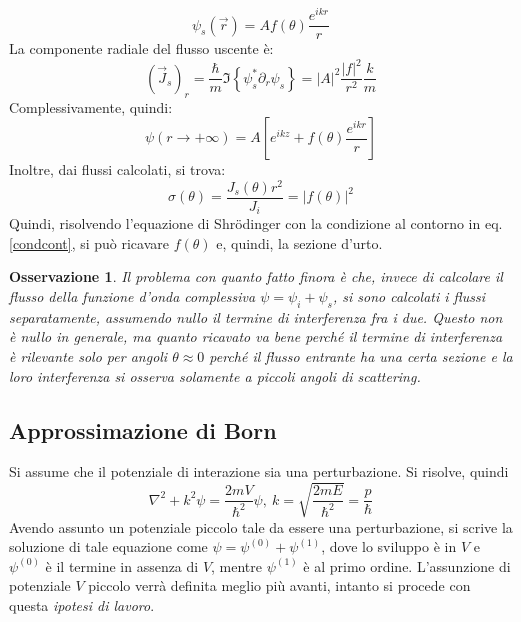 \documentclass[11pt, a4paper]{scrartcl} %
\numberwithin{equation}{subsection}
\theoremstyle{style2}
\newtheorem{osservazione}{Osservazione}[section]
\theoremstyle{style1}
\begin{document}
\begin{equation}
	\psi _s(\vec{r}) =A f(\theta ) \frac{e^{ikr}}{r} 
\end{equation}
La componente radiale del flusso uscente \`e:
\begin{equation}
	(\vec{J}_s)_r = \frac{\hbar }{m}\Im \left\{ \psi ^*_s \partial _r \psi _s \right\} = \lvert A \rvert ^2 \frac{\lvert f \rvert ^2}{r^2} \frac{k}{m}
\end{equation}
Complessivamente, quindi:
\begin{equation}\label{condcont}
	\psi (r\to +\infty) = A \left[ e^{ikz} + f(\theta ) \frac{e^{ikr} }{r} \right] 
\end{equation}
Inoltre, dai flussi calcolati, si trova:
\begin{equation}
	\sigma (\theta ) = \frac{J_s(\theta ) r^2}{J_i}= \lvert f(\theta ) \rvert ^2
\end{equation}
Quindi, risolvendo l'equazione di Shr\"odinger con la condizione al contorno in eq. \ref{condcont}, si pu\`o ricavare $f(\theta )$ e, quindi, la sezione d'urto.
\begin{osservazione}
Il problema con quanto fatto finora \`e che, invece di calcolare il flusso della funzione d'onda complessiva $\psi = \psi _i + \psi _s$, si sono calcolati i flussi separatamente, assumendo nullo il termine di interferenza fra i due. 
Questo non \`e nullo in generale, ma quanto ricavato va bene perch\'e il termine di interferenza \`e rilevante solo per angoli $\theta \approx 0$ perch\'e il flusso entrante ha una certa sezione e la loro interferenza si osserva solamente a piccoli angoli di scattering.
\end{osservazione}
\subsection{Approssimazione di Born}

Si assume che il potenziale di interazione sia una perturbazione.
Si risolve, quindi
\[
\nabla ^2 + k^2 \psi  = \frac{2mV}{\hbar ^2}\psi , \ k = \sqrt{\frac{2mE}{\hbar ^2}} = \frac{p}{\hbar }
\] 
Avendo assunto un potenziale piccolo tale da essere una perturbazione, si scrive la soluzione di tale equazione come $\psi = \psi ^{(0)}  + \psi ^{(1)} $, dove lo sviluppo \`e in $V$ e $\psi ^{(0)} $ \`e il termine in assenza di $V$, mentre $\psi ^{(1)} $ \`e al primo ordine.
L'assunzione di potenziale $V$ piccolo verr\`a definita meglio pi\`u avanti, intanto si procede con questa \textit{ipotesi di lavoro}.
\end{document}
